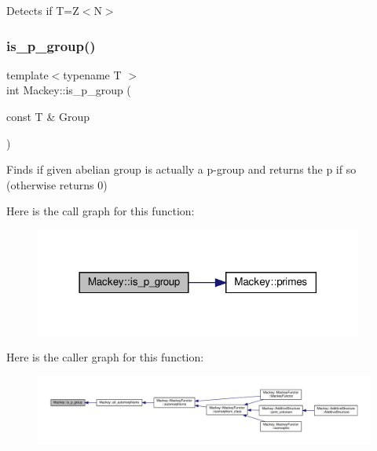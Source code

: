 Detects if T=Z$<$\+N$>$ 

\mbox{\label{namespaceMackey_a2b6ac22efe0be546f2c3f8abc2ceb5b7}} 
\subsubsection{\texorpdfstring{is\+\_\+p\+\_\+group()}{is\_p\_group()}}
{\footnotesize\ttfamily template$<$typename T $>$ \\
int Mackey\+::is\+\_\+p\+\_\+group (\begin{DoxyParamCaption}\item[{const T \&}]{Group }\end{DoxyParamCaption})}



Finds if given abelian group is actually a p-\/group and returns the p if so (otherwise returns 0) 

Here is the call graph for this function\+:\nopagebreak
\begin{figure}[H]
\begin{center}
\leavevmode
\includegraphics[width=306pt]{namespaceMackey_a2b6ac22efe0be546f2c3f8abc2ceb5b7_cgraph}
\end{center}
\end{figure}
Here is the caller graph for this function\+:\nopagebreak
\begin{figure}[H]
\begin{center}
\leavevmode
\includegraphics[width=350pt]{namespaceMackey_a2b6ac22efe0be546f2c3f8abc2ceb5b7_icgraph}
\end{center}
\end{figure}
\mbox{\label{namespaceMackey_a69fa6a0eac2520c76251b0799fa9357f}} 
